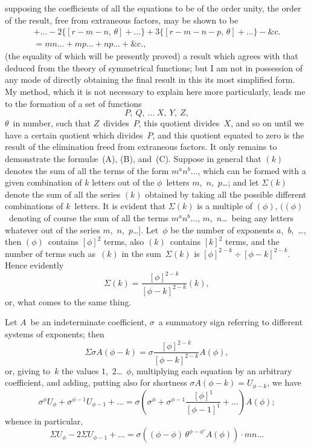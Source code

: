 \documentclass[11pt,a4paper]{book}
\begin{document}
\newpage
supposing the coefficients of all the equations to be of the order unity, the order of the result, free from extraneous factors, may be shown to be
\begin{multline*}
[r-m,\,\theta] + \ldots - 2\{[r-m-n,\,\theta] + \ldots\} + 3\{[r-m-n-p,\,\theta] + \ldots\} - \text{\&c.} \\
= mn\ldots + mp\ldots + np\ldots + \text{\&c.} \tag{C},
\end{multline*}
(the equality of which will be presently proved) a result which agrees with that deduced from the theory of symmetrical functions; but I am not in possession of any mode of directly obtaining the final result in this its most simplified form. My method, which it is not necessary to explain here more particularly, leads me to the formation of a set of functions
\[
P,\ Q,\ \ldots\ X,\ Y,\ Z,
\]
$\theta$~in number, such that $Z$~divides~$P$, this quotient divides~$X$, and so on until we have a certain quotient which divides~$P$, and this quotient equated to zero is the result of the elimination freed from extraneous factors. It only remains to demonstrate the formul\ae\ (A), (B), and~(C). Suppose in general that $(k)$ denotes the sum of all the terms of the form $m^a n^b \ldots$, which can be formed with a given combination of $k$ letters out of the $\phi$~letters $m$,~$n$,~$p$\ldots; and let $\Sigma(k)$ denote the sum of all the series $(k)$ obtained by taking all the possible different combinations of $k$~letters. It is evident that $\Sigma(k)$ is a multiple of $(\phi)$, $((\phi)$~denoting of course the sum of all the terms $m^a n^b \ldots$, $m$,~$n$\ldots\ being any letters whatever out of the series $m$,~$n$,~$p$\ldots]. Let~$\phi$ be the number of exponents $a$,~$b$,~\ldots, then $(\phi)$~contains $[\phi]^2$ terms, also $(k)$~contains $[k]^2$ terms, and the number of terms such as~$(k)$ in the sum~$\Sigma(k)$ is $[\phi]^{2-k} \div [\phi-k]^{2-k}$. Hence evidently
\[
\Sigma(k) = \frac{[\phi]^{2-k}}{[\phi-k]^{2-k}} (k),
\]
or, what comes to the same thing.

Let $A$~be an indeterminate coefficient, $\sigma$~a summatory sign referring to different systems of exponents; then
\[
\Sigma\sigma A(\phi-k) = \sigma\frac{[\phi]^{2-k}}{[\phi-k]^{2-k}} A(\phi),
\]
or, giving to~$k$ the values $1$,~$2$\ldots~$\phi$, multiplying each equation by an arbitrary coefficient, and adding, putting also for shortness $\sigma A(\phi-k) = U_{\phi-k}$, we have
\[
\sigma^\phi U_\phi + \sigma^{\phi-1} U_{\phi-1} + \ldots = \sigma\left(\sigma^\phi + \sigma^{\phi-1}\frac{[\phi]^1}{[\phi-1]^1} + \ldots\right) A(\phi);
\]
whence in particular,
\[
\Sigma U_\phi - 2\Sigma U_{\phi-1} + \ldots = \sigma\left((\phi-\phi)\,\theta^{\phi-\phi'} A(\phi)\right) \cdot mn\ldots
\]
\end{document}
